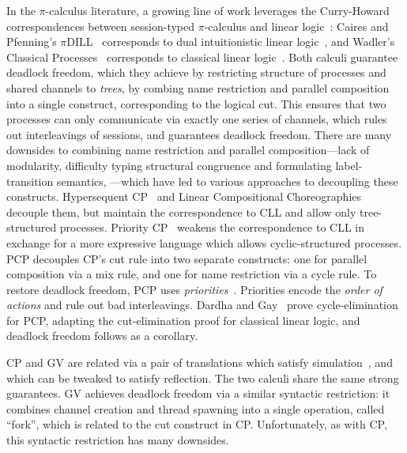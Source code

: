 \documentclass[main.tex]{subfiles}
\begin{document}
In the $\pi$-calculus literature, a growing line of work leverages the Curry-Howard correspondences between session-typed $\pi$-calculus and linear logic~\cite{girard87}: Caires and Pfenning's $\pi$DILL~\cite{cairespfenning10} corresponds to dual intuitionistic linear logic~\cite{barber96}, and Wadler's Classical Processes~\cite[CP]{wadler14} corresponds to classical linear logic~\cite[CLL]{girard87}. Both calculi guarantee deadlock freedom, which they achieve by restricting structure of processes and shared channels to \emph{trees}, by combing name restriction and parallel composition into a single construct, corresponding to the logical cut. This ensures that two processes can only communicate via exactly one series of channels, which rules out interleavings of sessions, and guarantees deadlock freedom.
There are many downsides to combining name restriction and parallel composition---lack of modularity, difficulty typing structural congruence and formulating label-transition semantics, \etc---which have led to various approaches to decoupling these constructs. Hypersequent CP~\cite{MP18,kokkemontesi19popl,kokkemontesi19tlla} and Linear Compositional Choreographies~\cite{CarboneMS18} decouple them, but maintain the correspondence to CLL and allow only tree-structured processes. Priority CP~\cite[PCP]{dardhagay18extended} weakens the correspondence to CLL in exchange for a more expressive language which allows cyclic-structured processes. PCP decouples CP's cut rule into two separate constructs: one for parallel composition via a mix rule, and one for name restriction via a cycle rule. To restore deadlock freedom, PCP uses \emph{priorities}~\cite{kobayashi06,padovani14}. Priorities encode the \emph{order of actions} and rule out bad interleavings. Dardha and Gay~\cite{dardhagay18extended} prove cycle-elimination for PCP, adapting the cut-elimination proof for classical linear logic, and deadlock freedom follows as a corollary.

CP and GV are related via a pair of translations which satisfy simulation~\cite{lindleymorris16}, and which can be tweaked to satisfy reflection. The two calculi share the same strong guarantees. GV achieves deadlock freedom via a similar syntactic restriction: it combines channel creation and thread spawning into a single operation, called ``fork'', which is related to the cut construct in CP. Unfortunately, as with CP, this syntactic restriction has many downsides.
\end{document}
